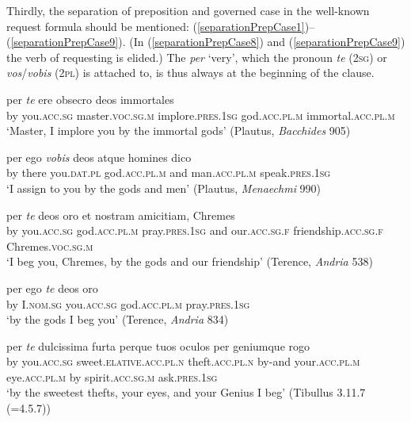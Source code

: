 Thirdly, the separation of preposition and governed case in the well-known request formula should be mentioned: (\ref{separationPrepCase1})--(\ref{separationPrepCase9}). (In (\ref{separationPrepCase8}) and (\ref{separationPrepCase9}) the verb of requesting is elided.) The \emph{per} `very', which the pronoun \emph{te} (\textsc{2sg}) or \emph{vos}/\emph{vobis} (\textsc{2pl}) is attached to, is thus always at the beginning of the clause.

\begin{exe}
\ex
\gll per \emph{te} ere obsecro deos immortales\\
by you.\textsc{acc.sg} master.\textsc{voc.sg.m} implore.\textsc{pres.1sg} god.\textsc{acc.pl.m} immortal.\textsc{acc.pl.m}\\
\trans `Master, I implore you by the immortal gods' (Plautus, \textit{Bacchides} 905)
\label{separationPrepCase1}
\end{exe}

\begin{exe}
\ex
\gll per ego \emph{vobis} deos atque homines dico\\
by there you.\textsc{dat.pl} god.\textsc{acc.pl.m} and man.\textsc{acc.pl.m} speak.\textsc{pres.1sg}\\
\trans `I assign to you by the gods and men' (Plautus, \textit{Menaechmi} 990)
\label{separationPrepCase2}
\end{exe}%

\begin{exe}
\ex
\gll per \emph{te} deos oro et nostram amicitiam, Chremes\\
by you.\textsc{acc.sg} god.\textsc{acc.pl.m} pray.\textsc{pres.1sg} and our.\textsc{acc.sg.f} friendship.\textsc{acc.sg.f} Chremes.\textsc{voc.sg.m}\\
\trans `I beg you, Chremes, by the gods and our friendship' (Terence, \textit{Andria} 538)
\label{separationPrepCase3}
\end{exe}

\begin{exe}
\ex
\gll per ego \emph{te} deos oro\\
by I.\textsc{nom.sg} you.\textsc{acc.sg} god.\textsc{acc.pl.m} pray.\textsc{pres.1sg}\\
\trans `by the gods I beg you' (Terence, \textit{Andria} 834)
\label{separationPrepCase4}
\end{exe}

\begin{exe}
\ex
\gll per \emph{te} dulcissima furta perque tuos oculos per geniumque rogo\\
by you.\textsc{acc.sg} sweet.\textsc{elative.acc.pl.n} theft.\textsc{acc.pl.n} by-and your.\textsc{acc.pl.m} eye.\textsc{acc.pl.m} by spirit.\textsc{acc.sg.m} ask.\textsc{pres.1sg}\\
\trans `by the sweetest thefts, your eyes, and your Genius I beg' (Tibullus 3.11.7 (=4.5.7))
\label{separationPrepCase5}
\end{exe}

